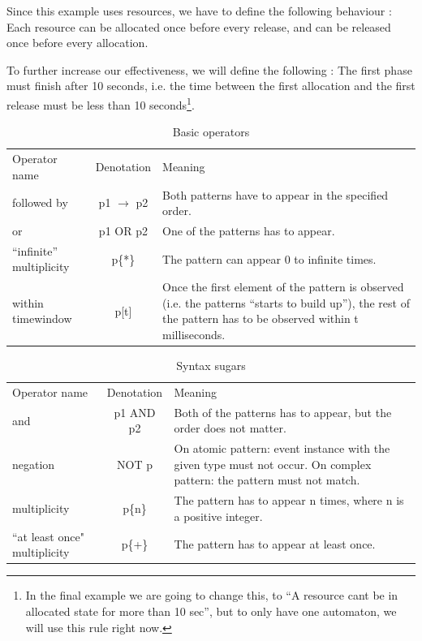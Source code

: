 		Since this example uses resources, we have to define the following behaviour :
		Each resource can be allocated once before every release, and can be released once before every allocation.
		
		To further increase our effectiveness, we will define the following : The first phase must finish after 10 seconds,
		i.e. the time between the first allocation and the first release must be less than 10 seconds\footnote{In the final 
		example we are going to change this, to ``A resource cant be in allocated state for more than 10 sec'', but to 
		only have one automaton, we will use this rule right now.}.
		
			
		\begin{table}
		\caption{Basic operators}		
		\label{tab:cep:veplop}
		\begin{tabular}{lcm{6cm}}
		\centering
		Operator name &	Denotation & Meaning \\
		followed by & p1 $\rightarrow$ p2 & Both patterns have to appear in the specified order. \\
		or &	p1 OR p2 &	One of the patterns has to appear. \\
		``infinite'' multiplicity &	p\{*\} &	The pattern can appear 0 to infinite times. \\
		within timewindow &	p[t] &	Once the first element of the pattern is observed (i.e. the patterns ``starts to build up''), the rest of the pattern has to be observed within t milliseconds.
		\end{tabular}
		\end{table}

		\begin{table}
		\caption{Syntax sugars}		
		\label{tab:cep:veplsugar}
		\begin{tabular}{lcm{6cm}}
		\centering
		Operator name &	Denotation & Meaning \\
		and &	p1 AND p2 &	Both of the patterns has to appear, but the order does not matter.\\
		negation &	NOT p &	On atomic pattern: event instance with the given type must not occur. On complex pattern: the pattern must not match. \\
		multiplicity &	p\{n\} &	The pattern has to appear n times, where n is a positive integer.\\
		``at least once" multiplicity &	p\{+\} &	The pattern has to appear at least once. \\
		\end{tabular}
		\end{table}
		
